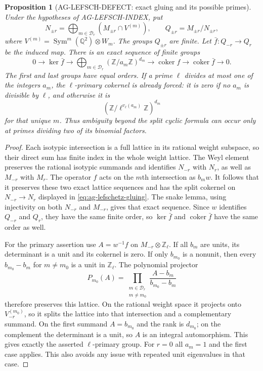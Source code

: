 \documentclass[11pt,a4paper]{article}
\newtheorem{proposition}{Proposition}
\begin{document}
\begin{proposition}[AG-LEFSCH-DEFECT: exact gluing and its possible primes]
Under the hypotheses of AG-LEFSCH-INDEX, put
\[
 N_{\pm r}=\bigoplus_{m\in\mathcal D_r}
       (M_{\pm r}\cap V^{(m)}),\qquad
 Q_{\pm r}=M_{\pm r}/N_{\pm r},
\]
where $V^{(m)}=\operatorname{Sym}^m(\mathbb Q^2)\otimes W_m$.
The groups $Q_{\pm r}$ are finite. Let
$\bar f:Q_{-r}\to Q_r$ be the induced map. There is an exact
sequence of finite groups
\begin{equation}\label{eq:ag-lefschetz-gluing}
 0\longrightarrow\ker\bar f
 \longrightarrow\bigoplus_{m\in\mathcal D_r}
        (\mathbb Z/a_m\mathbb Z)^{d_m}
 \longrightarrow\operatorname{coker}f
 \longrightarrow\operatorname{coker}\bar f
 \longrightarrow0.
\end{equation}
The first and last groups have equal orders. If a prime $\ell$
divides at most one of the integers $a_m$, the $\ell$-primary
cokernel is already forced: it is zero if no $a_m$ is divisible
by $\ell$, and otherwise it is
\[
 (\mathbb Z/\ell^{v_\ell(a_m)}\mathbb Z)^{d_m}
\]
for that unique $m$. Thus ambiguity beyond the split cyclic
formula can occur only at primes dividing two of its binomial
factors.
\end{proposition}
\begin{proof}
Each isotypic intersection is a full lattice in its rational
weight subspace, so their direct sum has finite index in the
whole weight lattice. The Weyl element preserves the rational
isotypic summands and identifies $N_{-r}$ with $N_r$, as well
as $M_{-r}$ with $M_r$. The operator $f$ acts on the $m$th
intersection as $b_m w$. It follows that it preserves these
two exact lattice sequences and has the split cokernel on
$N_{-r}\to N_r$ displayed in
\eqref{eq:ag-lefschetz-gluing}. The snake lemma, using
injectivity on both $N_{-r}$ and $M_{-r}$, gives that exact
sequence. Since $w$ identifies $Q_{-r}$ and $Q_r$, they have
the same finite order, so $\ker\bar f$ and
$\operatorname{coker}\bar f$ have the same order as well.

For the primary assertion use $A=w^{-1}f$ on
$M_{-r}\otimes\mathbb Z_\ell$. If all $b_m$ are units,
its determinant is a unit and its cokernel is zero.
If only $b_{m_0}$ is a nonunit, then every
$b_{m_0}-b_m$ for $m\ne m_0$ is a unit in $\mathbb Z_\ell$.
The polynomial projector
\[
 P_{m_0}(A)=\prod_{\substack{m\in\mathcal D_r\\m\ne m_0}}
       \frac{A-b_m}{b_{m_0}-b_m}
\]
therefore preserves this lattice. On the rational weight
space it projects onto $V^{(m_0)}_{-r}$, so it splits the
lattice into that intersection and a complementary summand.
On the first summand $A=b_{m_0}$ and the rank is $d_{m_0}$;
on the complement the determinant is a unit, so $A$ is an
integral automorphism. This gives exactly the asserted
$\ell$-primary group. For $r=0$ all $a_m=1$ and the first
case applies. This also avoids any issue with repeated unit
eigenvalues in that case.
\end{proof}
\end{document}
